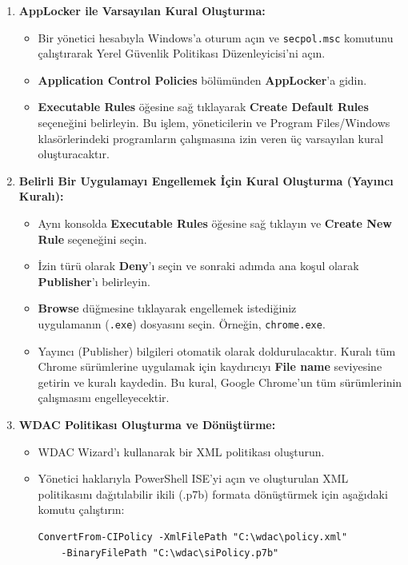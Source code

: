 \begin{enumerate}
    \item \textbf{AppLocker ile Varsayılan Kural Oluşturma:}
    \begin{itemize}
        \item Bir yönetici hesabıyla Windows'a oturum açın ve \texttt{secpol.msc} komutunu çalıştırarak Yerel Güvenlik Politikası Düzenleyicisi'ni açın.
        \item \textbf{Application Control Policies} bölümünden \textbf{AppLocker}'a gidin.
        \item \textbf{Executable Rules} öğesine sağ tıklayarak \textbf{Create Default Rules} seçeneğini belirleyin. Bu işlem, yöneticilerin ve Program Files/Windows klasörlerindeki programların çalışmasına izin veren üç varsayılan kural oluşturacaktır.
    \end{itemize}
    \item \textbf{Belirli Bir Uygulamayı Engellemek İçin Kural Oluşturma (Yayıncı Kuralı):}
    \begin{itemize}
        \item Aynı konsolda \textbf{Executable Rules} öğesine sağ tıklayın ve \textbf{Create New Rule} seçeneğini seçin.
        \item İzin türü olarak \textbf{Deny}'ı seçin ve sonraki adımda ana koşul olarak \textbf{Publisher}'ı belirleyin.
        \item \textbf{Browse} düğmesine tıklayarak engellemek istediğiniz \\
        uygulamanın (\texttt{.exe}) dosyasını seçin. Örneğin, \texttt{chrome.exe}.
        \item Yayıncı (Publisher) bilgileri otomatik olarak doldurulacaktır. Kuralı tüm Chrome sürümlerine uygulamak için kaydırıcıyı \textbf{File name} seviyesine getirin ve kuralı kaydedin. Bu kural, Google Chrome'un tüm sürümlerinin çalışmasını engelleyecektir.
    \end{itemize}
    \item \textbf{WDAC Politikası Oluşturma ve Dönüştürme:}
    \begin{itemize}
        \item WDAC Wizard'ı kullanarak bir XML politikası oluşturun.
        \item Yönetici haklarıyla PowerShell ISE'yi açın ve oluşturulan XML politikasını dağıtılabilir ikili (.p7b) formata dönüştürmek için aşağıdaki komutu çalıştırın:
        \begin{verbatim}
ConvertFrom-CIPolicy -XmlFilePath "C:\wdac\policy.xml" 
    -BinaryFilePath "C:\wdac\siPolicy.p7b"
        \end{verbatim}
    \end{itemize}
\end{enumerate}

